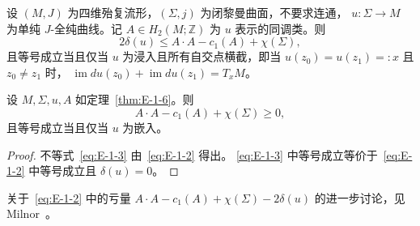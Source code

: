 \begin{theorem}\label{thm:E-1-6}
设 $(M,J)$ 为四维殆复流形，$(\Sigma,j)$ 为闭黎曼曲面，不要求连通，
$u:\Sigma\to M$ 为单纯 $J$-全纯曲线。记 $A\in H_2(M;\mathbb Z)$
为 $u$ 表示的同调类。则
\begin{equation}\label{eq:E-1-2}
  2\delta(u)\le A\cdot A-c_1(A)+\chi(\Sigma),
\end{equation}
且等号成立当且仅当 $u$ 为浸入且所有自交点横截，即当
$u(z_0)=u(z_1)=:x$ 且 $z_0\ne z_1$ 时，
$\operatorname{im}du(z_0)+\operatorname{im}du(z_1)=T_xM$。
\end{theorem}

\begin{corollary}[McDuff]\label{cor:E-1-7}
设 $M,\Sigma,u,A$ 如定理~\ref{thm:E-1-6}。则
\begin{equation}\label{eq:E-1-3}
  A\cdot A-c_1(A)+\chi(\Sigma)\ge0,
\end{equation}
且等号成立当且仅当 $u$ 为嵌入。
\end{corollary}
\begin{proof}
不等式~\eqref{eq:E-1-3} 由~\eqref{eq:E-1-2} 得出。
\eqref{eq:E-1-3} 中等号成立等价于~\eqref{eq:E-1-2} 中等号成立且
$\delta(u)=0$。
\end{proof}

\begin{remark}\label{rem:E-1-8}
关于~\eqref{eq:E-1-2} 中的亏量
$A\cdot A-c_1(A)+\chi(\Sigma)-2\delta(u)$ 的进一步讨论，见 Milnor~。
\end{remark}
